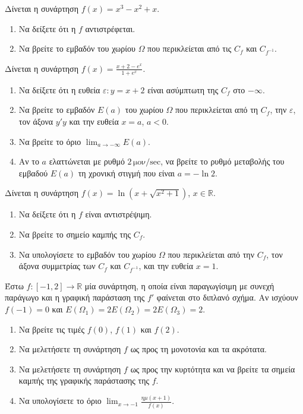 \documentclass{../presentation}
\begin{document}
\begin{askisi}
  Δίνεται η συνάρτηση $f(x)=x^3-x^2+x$.
  \begin{enumerate}[<+->]
    \item Να δείξετε ότι η $f$ αντιστρέφεται.
    \item Να βρείτε το εμβαδόν του χωρίου $Ω$ που περικλείεται από τις $C_f$ και $C_{f^{-1}}$.
  \end{enumerate}
\end{askisi}

\begin{askisi}
  Δίνεται η συνάρτηση $f(x) = \frac{x+2-e^x}{1+e^x}$.
  \begin{enumerate}[<+->]
    \item Να δείξετε ότι η ευθεία $ε: y = x+2$ είναι ασύμπτωτη της $C_f$ στο $-\infty$.
    \item Να βρείτε το εμβαδόν $E(a)$ του χωρίου $Ω$ που περικλείεται από τη $C_f$, την $ε$, τον άξονα $y'y$ και την ευθεία $x=a$, $a<0$.
    \item Να βρείτε το όριο $\lim_{a \to -\infty} E(a)$.
    \item Αν το $a$ ελαττώνεται με ρυθμό $2 \, \text{μον}/\text{sec}$, να βρείτε το ρυθμό μεταβολής του εμβαδού $E(a)$ τη χρονική στιγμή που είναι $a = -\ln 2$.
  \end{enumerate}
\end{askisi}

\begin{askisi}
  Δίνεται η συνάρτηση $f(x) = \ln(x+\sqrt{x^2+1})$, $x \in \mathbb{R}$.
  \begin{enumerate}[<+->]
    \item Να δείξετε ότι η $f$ είναι αντιστρέψιμη.
    \item Να βρείτε το σημείο καμπής της $C_f$.
    \item Να υπολογίσετε το εμβαδόν του χωρίου $Ω$ που περικλείεται από την $C_f$, τον άξονα συμμετρίας των $C_f$ και $C_{f^{-1}}$, και την ευθεία $x=1$.
  \end{enumerate}
\end{askisi}

\begin{askisi}
  Έστω $f:[-1,2] \to \mathbb{R}$ μία συνάρτηση, η οποία είναι παραγωγίσιμη με συνεχή παράγωγο και η γραφική παράσταση της $f'$ φαίνεται στο διπλανό σχήμα. Αν ισχύουν $f(-1)=0$ και $E(Ω_1) = 2E(Ω_2) = 2E(Ω_3) = 2$.
  \begin{enumerate}[<+->]
    \item Να βρείτε τις τιμές $f(0)$, $f(1)$ και $f(2)$.
    \item Να μελετήσετε τη συνάρτηση $f$ ως προς τη μονοτονία και τα ακρότατα.
    \item Να μελετήσετε τη συνάρτηση $f$ ως προς την κυρτότητα και να βρείτε τα σημεία καμπής της γραφικής παράστασης της $f$.
    \item Να υπολογίσετε το όριο $\lim_{x \to -1} \frac{ημ(x+1)}{f(x)}$.
  \end{enumerate}
\end{askisi}
\end{document}
